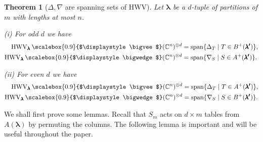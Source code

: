 \documentclass[12pt, reqno]{amsart}
\newtheorem{theorem}{Theorem}[section]
\theoremstyle{definition}
\let\oldbigwedge\bigwedge
\let\oldbigvee\bigvee
\renewcommand{\bigwedge}{
  \mathop{
    \vcenter{
      \hbox{\scalebox{0.9}{$\displaystyle\oldbigwedge$}}
    }
  }
}
\renewcommand{\bigvee}{
  \mathop{
    \vcenter{
      \hbox{\scalebox{0.9}{$\displaystyle\oldbigvee$}}
    }
  }
}
\begin{document}
\begin{theorem}[$\Delta, \nabla$ are spanning sets of HWV]\label{th:spanning-sets}
    Let $\pmb{\lambda}$ be a $d$-tuple of partitions of $m$ with lengths at most $n$. %

    (i) For odd $d$ we have 
    \begin{align*}
        \mathrm{HWV}_{\pmb{\lambda}} \bigvee (\mathbb{C}^n)^{\otimes d} 
        &= \mathrm{span}\{ 
            \Delta_T \mid T \in B^+(\pmb{\lambda'})
        \},\\
        \mathrm{HWV}_{\pmb{\lambda}} \bigwedge (\mathbb{C}^n)^{\otimes d} 
        &= \mathrm{span}\{ 
            \nabla_S \mid S \in A^+(\pmb{\lambda'})
        \}.
    \end{align*}

    (ii) For even $d$ we have
    \begin{align*}
        \mathrm{HWV}_{\pmb{\lambda}} \bigvee (\mathbb{C}^n)^{\otimes d} 
        &= \mathrm{span}\{ 
            \Delta_T \mid T \in A^+(\pmb{\lambda'})
        \},\\
        \mathrm{HWV}_{\pmb{\lambda}} \bigwedge (\mathbb{C}^n)^{\otimes d} 
        &= \mathrm{span}\{ 
            \nabla_S \mid S \in B^+(\pmb{\lambda'})
        \}.
    \end{align*}
\end{theorem}



We shall first prove some lemmas. Recall that $S_m$ acts on $d \times m$ tables from $A(\pmb{\lambda})$ by permuting the columns. The following lemma is important and will be useful throughout the paper.
\end{document}
